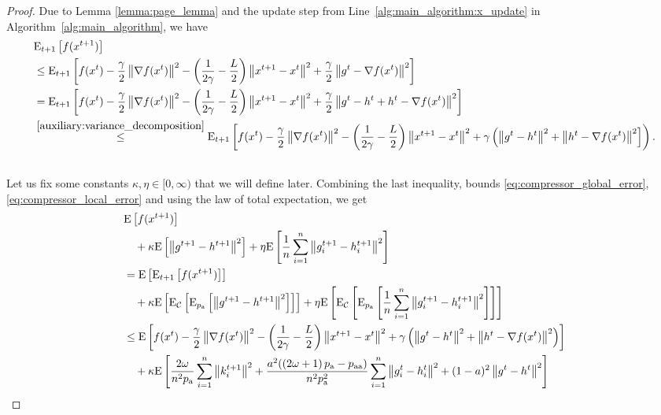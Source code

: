 \documentclass{article}
\newcommand*{\probavailable}{\ensuremath{p_{\textnormal{a}}}}
\newcommand*{\probpairaa}{\ensuremath{p_{\textnormal{aa}}}}
\begin{document}
\begin{proof}
  Due to Lemma \ref{lemma:page_lemma} and the update step from Line~\ref{alg:main_algorithm:x_update} in Algorithm~\ref{alg:main_algorithm}, we have
  \begin{align*}
    &{\rm E}_{t+1}\left[f(x^{t + 1})\right] \nonumber\\
    &\leq {\rm E}_{t+1}\left[f(x^t) - \frac{\gamma}{2}\left\| \nabla f(x^t) \right\|^2 - \left(\frac{1}{2\gamma} - \frac{L}{2}\right)
      \left\| x^{t+1} - x^t \right\|^2 + \frac{\gamma}{2}\left\| g^{t} - \nabla f(x^t) \right\|^2\right] \nonumber \\
      &= {\rm E}_{t+1}\left[f(x^t) - \frac{\gamma}{2}\left\| \nabla f(x^t) \right\|^2 - \left(\frac{1}{2\gamma} - \frac{L}{2}\right)
      \left\| x^{t+1} - x^t \right\|^2 + \frac{\gamma}{2}\left\| g^{t} - h^t + h^t - \nabla f(x^t) \right\|^2\right] \nonumber \\
      &\overset{\eqref{auxiliary:variance_decomposition}}{\leq} {\rm E}_{t+1}\left[f(x^t) - \frac{\gamma}{2}\left\| \nabla f(x^t) \right\|^2 - \left(\frac{1}{2\gamma} - \frac{L}{2}\right)
      \left\| x^{t+1} - x^t \right\|^2 + \gamma\left(\left\| g^{t} - h^t \right\|^2 + \left\| h^t - \nabla f(x^t) \right\|^2\right]\right). \nonumber \\
      \nonumber
  \end{align*}
  Let us fix some constants $\kappa, \eta \in [0,\infty)$ that we will define later. Combining the last inequality, bounds \eqref{eq:compressor_global_error}, \eqref{eq:compressor_local_error} and using the law of total expectation, we get
  \begin{align*}
      &\Exp{f(x^{t + 1})} \nonumber \\
      &\quad  + \kappa \Exp{\norm{g^{t+1} - h^{t+1}}^2} + \eta \Exp{\frac{1}{n}\sum_{i=1}^n\norm{g^{t+1}_i - h^{t+1}_i}^2} \nonumber\\
      &=\Exp{\ExpSub{t+1}{f(x^{t + 1})}} \nonumber \\
      &\quad  + \kappa \Exp{\ExpSub{\cC}{\ExpSub{\probavailable}{\norm{g^{t+1} - h^{t+1}}^2}}} + \eta \Exp{\ExpSub{\cC}{\ExpSub{\probavailable}{\frac{1}{n}\sum_{i=1}^n\norm{g^{t+1}_i - h^{t+1}_i}^2}}} \nonumber\\
      &\leq \Exp{f(x^t) - \frac{\gamma}{2}\norm{\nabla f(x^t)}^2 - \left(\frac{1}{2\gamma} - \frac{L}{2}\right)
      \norm{x^{t+1} - x^t}^2 + \gamma\left(\norm{g^{t} - h^t}^2 + \norm{h^{t} - \nabla f(x^t)}^2\right)} \nonumber\\
      &\quad +\kappa \Exp{\frac{2 \omega}{n^2 \probavailable}\sum_{i=1}^n\norm{k^{t+1}_i}^2 +\frac{a^2 (\left(2 \omega + 1\right)\probavailable - \probpairaa)}{n^2 \probavailable^2}\sum_{i=1}^n\norm{g^{t}_i - h^{t}_i}^2 + (1 - a)^2\norm{g^{t} - h^{t}}^2} \nonumber\\

\end{align*}
\end{proof}
\end{document}

